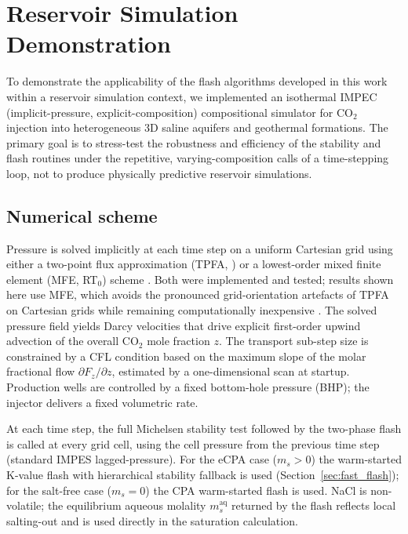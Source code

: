 \documentclass[preprint,12pt,authoryear]{elsarticle}
\begin{document}
\section{Reservoir Simulation Demonstration}
\label{sec:simulator}

To demonstrate the applicability of the flash algorithms developed in this work within
a reservoir simulation context, we implemented an isothermal IMPEC
(implicit-pressure, explicit-composition) compositional simulator for CO$_2$ injection
into heterogeneous 3D saline aquifers and geothermal formations.
The primary goal is to stress-test the robustness and efficiency of the stability and
flash routines under the repetitive, varying-composition calls of a time-stepping loop,
not to produce physically predictive reservoir simulations.

\subsection{Numerical scheme}
\label{sec:sim_scheme}

Pressure is solved implicitly at each time step on a uniform Cartesian grid using either
a two-point flux approximation (TPFA, \citealt{Aavatsmark2003}) or a lowest-order
mixed finite element (MFE, RT$_0$) scheme \citep{chaventjaffre}.
Both were implemented and tested; results shown here use MFE, which avoids the
pronounced grid-orientation artefacts of TPFA on Cartesian grids while remaining
computationally inexpensive \citep{moortgat2011compositional,moortgat2013higher,moortgat2016mixed}.
The solved pressure field yields Darcy velocities that drive explicit first-order upwind
advection of the overall CO$_2$ mole fraction $z$.
The transport sub-step size is constrained by a CFL condition based on the maximum
slope of the molar fractional flow $\partial F_z / \partial z$, estimated by a
one-dimensional scan at startup.
Production wells are controlled by a fixed bottom-hole pressure (BHP); the injector delivers a fixed volumetric rate.

At each time step, the full Michelsen stability test followed by the two-phase flash
is called at every grid cell, using the cell pressure from the previous time step
(standard IMPES lagged-pressure).
For the eCPA case ($m_s > 0$) the warm-started K-value flash with hierarchical stability
fallback is used (Section~\ref{sec:fast_flash}); for the salt-free case ($m_s = 0$) the
CPA warm-started flash is used.
NaCl is non-volatile; the equilibrium aqueous molality $m_s^\mathrm{aq}$ returned by the
flash reflects local salting-out and is used directly in the saturation calculation.
\end{document}
